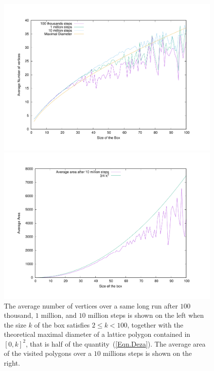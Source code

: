 \documentclass[a4paper]{article}
\begin{document}
\noindent
\begin{figure}[t]
  \hspace{-1cm}
    \begin{minipage}[c]{.5\linewidth}
      \includegraphics[scale=.25]{averageVertices}
    \end{minipage}
    \begin{minipage}[c]{.49\linewidth}
      \includegraphics[scale=.25]{averageVolume10M}
    \end{minipage}
    \caption{The average number of vertices over a same long run after $100$ thousand, $1$ million, and $10$ million steps is shown on the left when the size $k$ of the box satisfies $2\leq k<100$, together with the theoretical maximal diameter of a lattice polygon contained in $[0,k]^2$, that is half of the quantity~(\ref{Eqn.Deza}). The average area of the visited polygons over a $10$ millions steps is shown on the right.%
    \label{Fig.NV}}
\end{figure}
\end{document}

